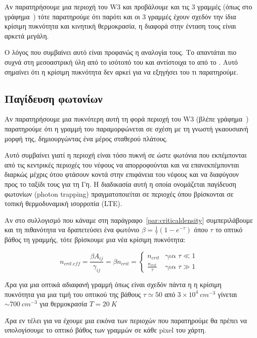 \documentclass[a4paper,12pt]{memoir}
\newcommand{\e}[1]{\times 10^{#1}}
\begin{document}
Αν παρατηρήσουμε μια περιοχή του W3 και προβάλουμε και τις 3 γραμμές (όπως στο γράφημα~) τότε παρατηρούμε ότι παρότι και οι 3 γραμμές έχουν σχεδόν την ίδια κρίσιμη πυκνότητα και κινητική θερμοκρασία, η διαφορά στην ένταση τους είναι αρκετά μεγάλη. 

Ο λόγος που συμβαίνει αυτό είναι προφανώς η αναλογία τους. Το  απαντάται πιο συχνά στη μεσοαστρική ύλη από το ισότοπό του  και αντίστοιχα το  από το . Αυτό σημαίνει ότι η κρίσιμη πυκνότητα δεν αρκεί για να εξηγήσει του τι παρατηρούμε.

\subsection{Παγίδευση φωτονίων}
Αν παρατηρήσουμε μια πυκνότερη αυτή τη φορά περιοχή του W3 (βλέπε γράφημα~) παρατηρούμε ότι η γραμμή του  παραμορφώνεται σε σχέση με τη γνωστή γκαουσιανή μορφή της, δημιουργώντας ένα μέρος σταθερού πλάτους. 

Αυτό συμβαίνει γιατί η περιοχή είναι τόσο πυκνή σε  ώστε φωτόνια που εκπέμπονται από τις κεντρικές περιοχές του νέφους να απορροφούνται και να επανεκπέμπονται διαρκώς μέχρις ότου φτάσουν κοντά στην επιφάνεια του νέφους και να διαφύγουν προς το ταξίδι τους για τη Γη. Η διαδικασία αυτή η οποία ονομάζεται παγίδευση φωτονίων (photon trapping) πραγματοποιείται σε περιοχές όπου βρίσκονται σε τοπική θερμοδυναμική ισορροπία (LTE).

Αν στο συλλογισμό που κάναμε στη παράγραφο~\ref{par:criticaldensity} συμπεριλάβουμε και τη πιθανότητα να δραπετεύσει ένα φωτόνιο $\beta = \frac{1}{\tau} (1-e^{-\tau})$ \cite{goldreich_1974} όπου $\tau$ το οπτικό βάθος τη γραμμής, τότε βρίσκουμε μια νέα κρίσιμη πυκνότητα:

\begin{equation}
n_{crit.eff}=\frac{\beta A_{ij}}{\gamma _{ij}}=\beta n_{crit} = 
\begin{cases}
 n_{crit} & \text{για } \tau \ll 1\\
\frac{n_{crit}}{\tau} & \text{για } \tau \gg 1
\end{cases}
\end{equation}

Άρα για μια οπτικά αδιαφανή γραμμή όπως είναι σχεδόν πάντα η  η κρίσιμη πυκνότητα για μια τιμή του οπτικού της βάθους $\tau \simeq 50$ από $3\e{4}\ cm^{-3}$ γίνεται $\sim 700\ cm^{-3}$ για θερμοκρασία $T=20\ K$ 

Άρα εν τέλει για να έχουμε μια εικόνα των περιοχών που παρατηρούμε θα πρέπει να υπολογίσουμε το οπτικό βάθος των γραμμών σε κάθε pixel του χάρτη.
\end{document}
